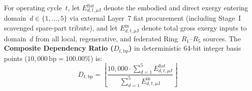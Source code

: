 For operating cycle~$t$, let $E^{\mathrm{fiat}}_{d,t,\mu\mathrm{J}}$ denote the embodied and direct exergy entering domain~$d \in \{1,\dots,5\}$ via external Layer~7 fiat procurement (including Stage~I scavenged spare-part tribute), and let $E^{\mathrm{in}}_{d,t,\mu\mathrm{J}}$ denote total gross exergy inputs to domain~$d$ from all local, regenerative, and federated Ring~$R_1\text{--}R_5$ sources. The \textbf{Composite Dependency Ratio ($D_{t,\mathrm{bp}}$)} in deterministic 64-bit integer basis points ($10{,}000\,\mathrm{bp} = 100.00\%$) is:
\begin{equation}
D_{t,\mathrm{bp}} = \left\lfloor \frac{10{,}000 \cdot \sum_{d=1}^{5} E^{\mathrm{fiat}}_{d,t,\mu\mathrm{J}}}{\sum_{d=1}^{5} E^{\mathrm{in}}_{d,t,\mu\mathrm{J}}} \right\rfloor
\label{eq:ch14-dependency-ratio-bp}
\end{equation}

\begin{table}[htbp]
\centering
\caption{Monotonic Trajectory of the Dependency Ratio ($D_{t,\mathrm{bp}}$), Hardware Fleet Mix, and Layer~7 Posture Across Maturation Stages}
\label{tab:ch14-severance-trajectory}
\small
{}
\end{table}

